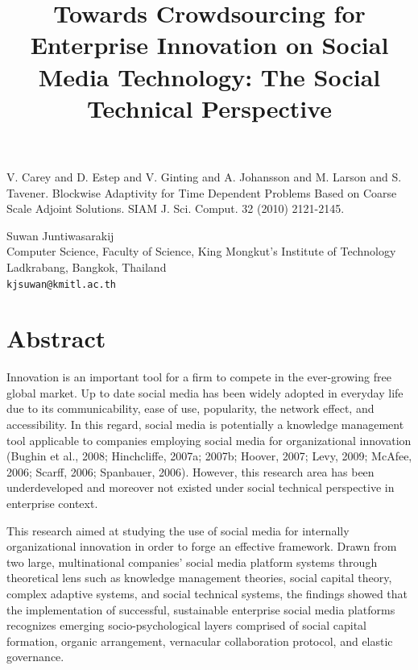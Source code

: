 \documentclass[article, A4, 11pt]{llncs}%
\begin{document}

\begin{thebibliography}{10}
{\sc V. Carey and D. Estep and V. Ginting and A. Johansson and M. Larson and S. Tavener}. {Blockwise Adaptivity for Time Dependent Problems Based on Coarse Scale Adjoint Solutions}. SIAM J. Sci. Comput. 32 (2010) 2121-2145.
\end{thebibliography} %

\title{Towards Crowdsourcing for Enterprise Innovation on Social Media Technology: The Social Technical Perspective}
 \author{} \institute{}
\maketitle
\begin{center}
{\large Suwan Juntiwasarakij}\\
Computer Science, Faculty of Science, King Mongkut's Institute of Technology Ladkrabang, Bangkok, Thailand\\
{\tt kjsuwan@kmitl.ac.th}
\end{center}

\section*{Abstract}
Innovation is an important tool for a firm to compete in the ever-growing free global market. Up to date social media has been widely adopted in everyday life due to its communicability, ease of use, popularity, the network effect, and accessibility. In this regard, social media is potentially a knowledge management tool applicable to companies employing social media for organizational innovation (Bughin et al., 2008; Hinchcliffe, 2007a; 2007b; Hoover, 2007; Levy, 2009; McAfee, 2006; Scarff, 2006; Spanbauer, 2006). However, this research area has been underdeveloped and moreover not existed under social technical perspective in enterprise context.

This research aimed at studying the use of social media for internally organizational innovation in order to forge an effective framework. Drawn from two large, multinational companies’ social media platform systems through theoretical lens such as knowledge management theories, social capital theory, complex adaptive systems, and social technical systems, the findings showed that the implementation of successful, sustainable enterprise social media platforms recognizes emerging socio-psychological layers comprised of social capital formation, organic arrangement, vernacular collaboration protocol, and elastic governance. 
\end{document}
